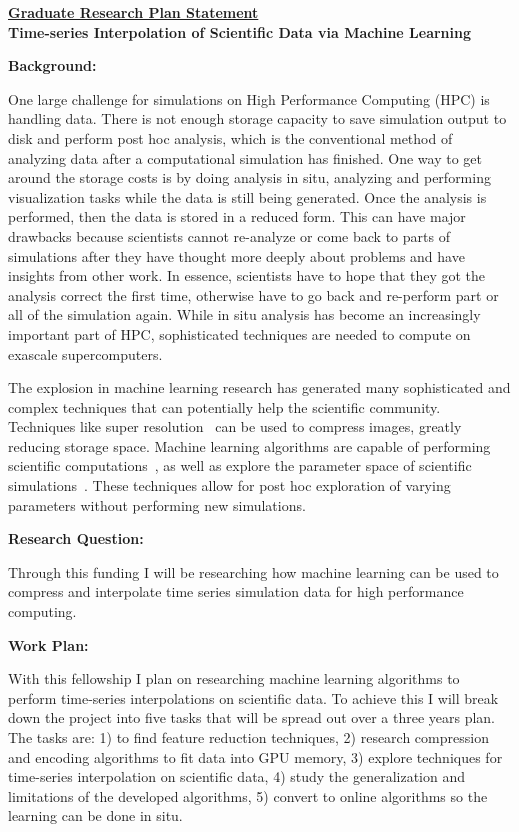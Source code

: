 \documentclass[12pt]{article}
\begin{document}
\begin{center}
\underline{\bf Graduate Research Plan Statement}\\
{\bf Time-series Interpolation of Scientific Data via Machine Learning} \\
\end{center}


\textbf{Background:}
%

One large challenge for simulations on High Performance Computing (HPC) is
handling data. There is not enough storage capacity to save simulation output to
disk and perform post hoc analysis, which is the conventional method of
analyzing data after a computational simulation has finished. One way to get
around the storage costs is by doing analysis in situ, analyzing and performing
visualization tasks while the data is still being generated. Once the analysis
is performed, then the data is stored in a reduced form. This can have major
drawbacks because scientists cannot re-analyze or come back to parts of
simulations after they have thought more deeply about problems and have insights
from other work. In essence, scientists have to hope that they got the analysis
correct the first time, otherwise have to go back and re-perform part or all of
the simulation again. While in situ analysis has become an increasingly
important part of HPC, sophisticated techniques are needed to compute on
exascale supercomputers.

 The explosion in machine learning research has generated many
sophisticated and complex techniques that can potentially help the scientific
community. Techniques like super resolution~\cite{super} can be used to
compress images, greatly reducing storage space. Machine learning algorithms are
capable of performing scientific computations~\cite{Berg}, as well as explore
the parameter space of scientific simulations~\cite{He}. These techniques 
allow for post hoc exploration of varying parameters without performing new
simulations.


\textbf{Research Question:}

 Through this funding I will be researching how machine learning can be
used to compress and interpolate time series simulation data for high
performance computing.


\textbf{Work Plan:}

 With this fellowship I plan on researching machine learning algorithms
to perform time-series interpolations on scientific data. To achieve this I will
break down the project into five tasks that will be spread out over a three
years plan. The tasks are: 1) to find feature reduction techniques, 2) research
compression and encoding algorithms to fit data into GPU memory, 3) explore
techniques for time-series interpolation on scientific data, 4) study the
generalization and limitations of the developed algorithms, 5) convert to online
algorithms so the learning can be done in situ.
\end{document}
